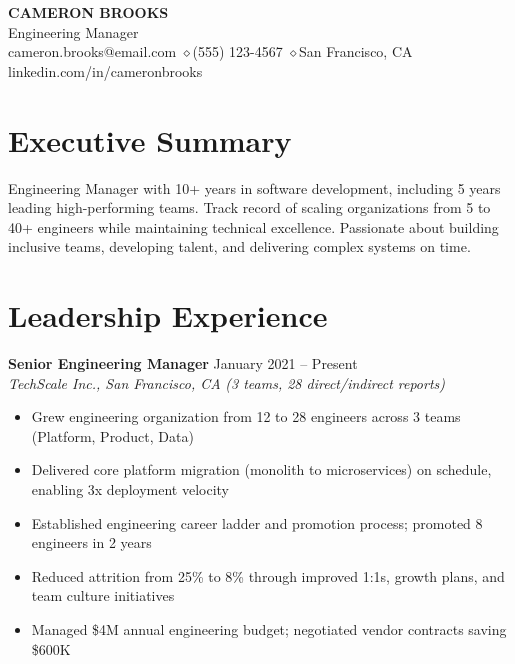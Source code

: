 \documentclass[11pt,a4paper]{article}
\begin{document}
\begin{center}
{\Huge\bfseries\color{accent} CAMERON BROOKS}\\[0.5em]
{\Large Engineering Manager}\\[0.4em]
{\small cameron.brooks@email.com \quad$\diamond$\quad (555) 123-4567 \quad$\diamond$\quad San Francisco, CA}\\
{\small linkedin.com/in/cameronbrooks}
\end{center}

\vspace{0.5em}

\section{Executive Summary}
Engineering Manager with 10+ years in software development, including 5 years leading high-performing teams. Track record of scaling organizations from 5 to 40+ engineers while maintaining technical excellence. Passionate about building inclusive teams, developing talent, and delivering complex systems on time.

\section{Leadership Experience}

\noindent\textbf{Senior Engineering Manager} \hfill January 2021 -- Present\\
\textit{TechScale Inc., San Francisco, CA} \quad\textit{(3 teams, 28 direct/indirect reports)}
\begin{itemize}[leftmargin=1.5em,nosep]
\item Grew engineering organization from 12 to 28 engineers across 3 teams (Platform, Product, Data)
\item Delivered core platform migration (monolith to microservices) on schedule, enabling 3x deployment velocity
\item Established engineering career ladder and promotion process; promoted 8 engineers in 2 years
\item Reduced attrition from 25\% to 8\% through improved 1:1s, growth plans, and team culture initiatives
\item Managed \$4M annual engineering budget; negotiated vendor contracts saving \$600K
\end{itemize}
\vspace{0.5em}
\end{document}
